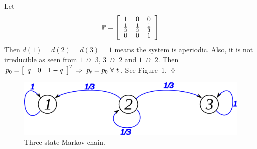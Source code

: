 \begin{example}
Let
$$\mathbb{P} = \left[\begin{array}{c c c} 1 & 0 & 0 \\ \frac{1}{3} & \frac{1}{3} & \frac{1}{3} \\ 0 & 0 & 1 \end{array}\right]$$
Then $d (1)=d (2)=d (3)=1$ means the system is aperiodic.
Also, it is not irreducible as seen from $1\nrightarrow~3$, $3\nrightarrow~2$ and $1\nrightarrow~2$.
Then $p_0=\left[\begin{array}{c c c} q & 0 & 1-q \end{array}\right]^T \Rightarrow~p_t=p_0~\forall~t$.
See Figure~\ref{fig:10mc3a}.
$\lozenge$
\end{example}

\begin{figure}[ht!]
\centering
\includegraphics[width=.4\textwidth]{images/10mc3a}
\caption{Three state Markov chain.}
\label{fig:10mc3a}
\end{figure}

